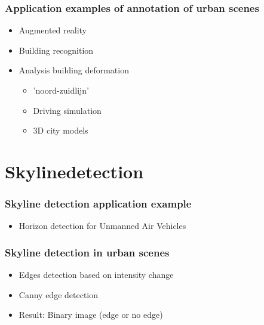 \documentclass{beamer}
\begin{document}
\frame
{
	\frametitle{Application examples of annotation of urban scenes}
	\begin{itemize}
		\item <+-| alert@+> Augmented reality
		\item <+-| alert@+> Building recognition
		\item <+-| alert@+> Analysis building deformation
		\begin{itemize}
			\item <+-| alert@+> 	'noord-zuidlijn'
		\item <+-| alert@+> Driving simulation
		\item <+-| alert@+> 3D city models
		\end{itemize}
	\end{itemize}
}

\frame
{
}

\frame
{
}

\frame
{
}

\frame
{
}

\section{Skylinedetection}
\frame
{
	\frametitle{Skyline detection application example}
	\begin{itemize}
		\item <+-| alert@+> Horizon detection for Unmanned Air Vehicles
	\end{itemize}
}

\frame
{
	\frametitle{Skyline detection in urban scenes}%
	\begin{itemize}
		\item <+-| alert@+> Edges detection based on intensity change
		\item <+-| alert@+> Canny edge detection 
		\item <+-| alert@+> Result: Binary image (edge or no edge)

	\end{itemize}
}
\end{document}
